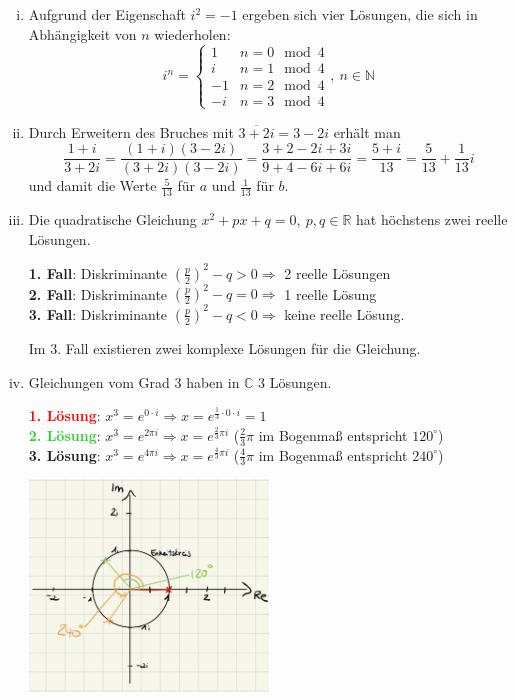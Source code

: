 \documentclass[12pt,a4paper]{article}
\begin{document}
\begin{enumerate}[(i)]
    \item Aufgrund der Eigenschaft $i^2 = -1$ ergeben sich vier Lösungen, die sich in Abhängigkeit von $n$ wiederholen:
    $$i^n = \left\lbrace\begin{matrix}
    1 & n = 0 \mod 4\\
    i & n = 1 \mod 4\\
    -1 & n = 2 \mod 4\\
    -i & n = 3 \mod 4
    \end{matrix}\right.,\ n \in \mathbb{N}$$

    \item Durch Erweitern des Bruches mit $\overline{3+2i} = 3-2i$ erhält man
    $$\frac{1+i}{3+2i} = \frac{(1+i)(3-2i)}{(3+2i)(3-2i)} = \frac{3+2-2i+3i}{9+4-6i+6i} = \frac{5+i}{13} = \frac{5}{13} + \frac{1}{13}i$$
    und damit die Werte $\frac{5}{13}$ für $a$ und $\frac{1}{13}$ für $b$.

    \item Die quadratische Gleichung $x^2 + px + q = 0,\ p,q \in \mathbb{R}$ hat höchstens zwei reelle Lösungen.

    \textbf{1. Fall}: Diskriminante $\left(\frac{p}{2}\right)^2 - q > 0 \Rightarrow$ 2 reelle Lösungen\\
    \textbf{2. Fall}: Diskriminante $\left(\frac{p}{2}\right)^2 - q = 0 \Rightarrow$ 1 reelle Lösung\\
    \textbf{3. Fall}: Diskriminante $\left(\frac{p}{2}\right)^2 - q < 0 \Rightarrow$ keine reelle Lösung.

    Im 3. Fall existieren zwei komplexe Lösungen für die Gleichung.

    \item Gleichungen vom Grad 3 haben in $\mathbb{C}$ 3 Lösungen.

    \textcolor{red}{\textbf{1. Lösung}}: $x^3 = e^{0 \cdot i} \Rightarrow x = e^{\frac{1}{3} \cdot 0 \cdot i} = 1$\\
    \textcolor{LimeGreen}{\textbf{2. Lösung}}: $x^3 = e^{2 \pi i} \Rightarrow x = e^{\frac{2}{3} \pi i}$ ($\frac{2}{3} \pi$ im Bogenmaß entspricht $120^\circ$)\\
    \textcolor{YellowOrange}{\textbf{3. Lösung}}: $x^3 = e^{4 \pi i} \Rightarrow x = e^{\frac{4}{3} \pi i}$ ($\frac{4}{3} \pi$ im Bogenmaß entspricht $240^\circ$)

    \begin{minipage}{\linewidth}
        \centering
        \includegraphics[width=0.5\textwidth]{a14iv.jpg}
        \label{fig:a14iv}
    \end{minipage}


\end{enumerate}
\end{document}

